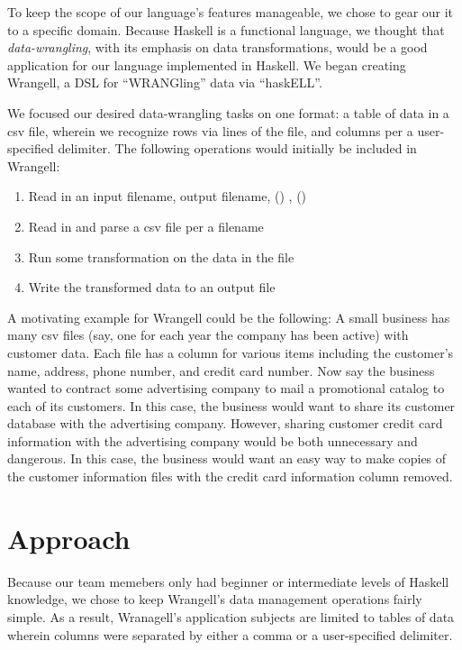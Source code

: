 \documentclass[preprint,nocopyrightspace]{sig-alternate}
\begin{document}
To keep the scope of our language's features manageable, we chose to gear our it to a specific domain. Because Haskell is a functional language, we thought that \emph{data-wrangling}, with its emphasis on data transformations, would be a good application for our language implemented in Haskell. We began creating Wrangell, a DSL for ``WRANGling'' data via ``haskELL''.  

We focused our desired data-wrangling tasks on one format: a table of data in a csv file, wherein we recognize rows via lines of the file, and columns per a user-specified delimiter. The following operations would initially be included in Wrangell:

\begin{enumerate}
\item Read in an input filename, output filename, () , ()
\item Read in and parse a csv file per a filename 
\item Run some transformation on the data in the file
\item Write the transformed data to an output file
\end{enumerate}

A motivating example for Wrangell could be the following: A small business has many csv files (say, one for each year the company has been active) with customer data. Each file has a column for various items including the customer's name, address, phone number, and credit card number. Now say the business wanted to contract some advertising company to mail a promotional catalog to each of its customers. In this case, the business would want to share its customer database with the advertising company. However, sharing customer credit card information with the advertising company would be both unnecessary and dangerous. In this case,  the business would want an easy way to make copies of the customer information files with the credit card information column removed.   


\section{Approach}

Because our team memebers only had beginner or intermediate levels of Haskell knowledge, we chose to keep Wrangell's data management operations fairly simple. 
As a result, Wranagell's application subjects are limited to tables of data wherein columns were separated by either a comma or a user-specified delimiter.
\end{document}

